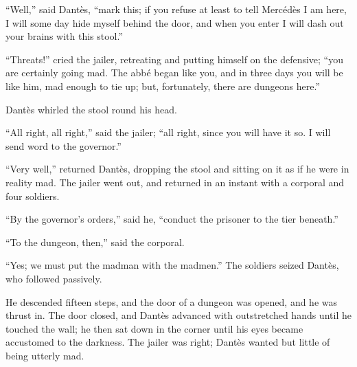 “Well,” said Dantès, “mark this; if you refuse at least to tell
Mercédès I am here, I will some day hide myself behind the door, and
when you enter I will dash out your brains with this stool.”

“Threats!” cried the jailer, retreating and putting himself on the
defensive; “you are certainly going mad. The abbé began like you, and
in three days you will be like him, mad enough to tie up; but,
fortunately, there are dungeons here.”

Dantès whirled the stool round his head.

“All right, all right,” said the jailer; “all right, since you will
have it so. I will send word to the governor.”

“Very well,” returned Dantès, dropping the stool and sitting on it as
if he were in reality mad. The jailer went out, and returned in an
instant with a corporal and four soldiers.

“By the governor’s orders,” said he, “conduct the prisoner to the tier
beneath.”

“To the dungeon, then,” said the corporal.

“Yes; we must put the madman with the madmen.” The soldiers seized
Dantès, who followed passively.

He descended fifteen steps, and the door of a dungeon was opened, and
he was thrust in. The door closed, and Dantès advanced with
outstretched hands until he touched the wall; he then sat down in the
corner until his eyes became accustomed to the darkness. The jailer was
right; Dantès wanted but little of being utterly mad.
